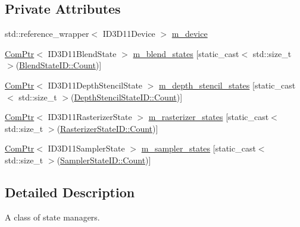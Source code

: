 \subsection*{Private Attributes}
\begin{DoxyCompactItemize}
\item 
std\+::reference\+\_\+wrapper$<$ I\+D3\+D11\+Device $>$ \mbox{\hyperlink{classmage_1_1rendering_1_1_state_manager_abfe78953d7404fc86e85531ac296281b}{m\+\_\+device}}
\item 
\mbox{\hyperlink{namespacemage_ae74f374780900893caa5555d1031fd79}{Com\+Ptr}}$<$ I\+D3\+D11\+Blend\+State $>$ \mbox{\hyperlink{classmage_1_1rendering_1_1_state_manager_a382fdb43f486733cc68ed70ab082500f}{m\+\_\+blend\+\_\+states}} \mbox{[}static\+\_\+cast$<$ std\+::size\+\_\+t $>$(\mbox{\hyperlink{namespacemage_1_1rendering_abdf11cdb816b9208aec6c3a81f7564abae93f994f01c537c4e2f7d8528c3eb5e9}{Blend\+State\+I\+D\+::\+Count}})\mbox{]}
\item 
\mbox{\hyperlink{namespacemage_ae74f374780900893caa5555d1031fd79}{Com\+Ptr}}$<$ I\+D3\+D11\+Depth\+Stencil\+State $>$ \mbox{\hyperlink{classmage_1_1rendering_1_1_state_manager_a3c70874e3c0dd286eacaba5506f4bb49}{m\+\_\+depth\+\_\+stencil\+\_\+states}} \mbox{[}static\+\_\+cast$<$ std\+::size\+\_\+t $>$(\mbox{\hyperlink{namespacemage_1_1rendering_ace195e7a068336e477080fce30f1329eae93f994f01c537c4e2f7d8528c3eb5e9}{Depth\+Stencil\+State\+I\+D\+::\+Count}})\mbox{]}
\item 
\mbox{\hyperlink{namespacemage_ae74f374780900893caa5555d1031fd79}{Com\+Ptr}}$<$ I\+D3\+D11\+Rasterizer\+State $>$ \mbox{\hyperlink{classmage_1_1rendering_1_1_state_manager_a50380d87e965ff768eeb0a5fc11777ea}{m\+\_\+rasterizer\+\_\+states}} \mbox{[}static\+\_\+cast$<$ std\+::size\+\_\+t $>$(\mbox{\hyperlink{namespacemage_1_1rendering_ac878731f5dc22a3a36ccfbfc77c3facaae93f994f01c537c4e2f7d8528c3eb5e9}{Rasterizer\+State\+I\+D\+::\+Count}})\mbox{]}
\item 
\mbox{\hyperlink{namespacemage_ae74f374780900893caa5555d1031fd79}{Com\+Ptr}}$<$ I\+D3\+D11\+Sampler\+State $>$ \mbox{\hyperlink{classmage_1_1rendering_1_1_state_manager_a13206be2f63b38f000379599f9ed9650}{m\+\_\+sampler\+\_\+states}} \mbox{[}static\+\_\+cast$<$ std\+::size\+\_\+t $>$(\mbox{\hyperlink{namespacemage_1_1rendering_a6f80181126db61dbb8b528a6894eb658ae93f994f01c537c4e2f7d8528c3eb5e9}{Sampler\+State\+I\+D\+::\+Count}})\mbox{]}
\end{DoxyCompactItemize}


\subsection{Detailed Description}
A class of state managers. 


